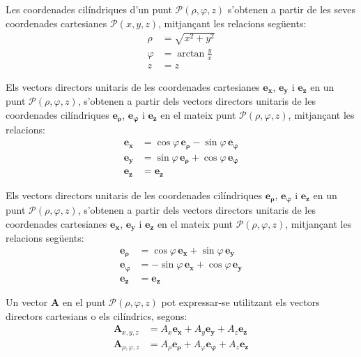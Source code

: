 \documentclass[catalan,a4paper,twoside,11pt]{article}
\begin{document}
Les coordenades  cilíndriques  d'un punt $\mathscr{P}(\rho,\varphi,z)$
s'obtenen a partir de les seves coordenades cartesianes $\mathscr{P}(x,y,z)$,
mitjançant les relacions següents:
\begin{subequations}\begin{align}
    \rho &= \sqrt{x^2+y^2}\\
    \varphi &=  \arctan\frac{y}{x}\\
    z &= z
\end{align}\end{subequations}

Els vectors directors unitaris de les coordenades cartesianes  $\boldsymbol{e_x}$, $\boldsymbol{e_y}$ i $\boldsymbol{e_z}$ en un punt $\mathscr{P}(\rho,\varphi,z)$,  s'obtenen a partir dels vectors directors unitaris de les coordenades cilíndriques $\boldsymbol{e_\rho}$, $\boldsymbol{e_\varphi}$ i $\boldsymbol{e_z}$ en el mateix punt $\mathscr{P}(\rho,\varphi,z)$, mitjançant les relacions:
\begin{subequations}\begin{align}
		\boldsymbol{e_x} &=\cos\varphi\,\boldsymbol{e_\rho}-\sin\varphi\,\boldsymbol{e_\varphi} \\
		\boldsymbol{e_y} &=\sin\varphi\,\boldsymbol{e_\rho}+\cos\varphi\,\boldsymbol{e_\varphi} \\
		\boldsymbol{e_z} &=\boldsymbol{e_z}
\end{align}\end{subequations}

Els vectors directors unitaris de les coordenades cilíndriques  $\boldsymbol{e_\rho}$, $\boldsymbol{e_\varphi}$ i $\boldsymbol{e_z}$ en un punt $\mathscr{P}(\rho,\varphi,z)$, s'obtenen a partir dels vectors directors unitaris de les coordenades cartesianes $\boldsymbol{e_x}$, $\boldsymbol{e_y}$ i $\boldsymbol{e_z}$ en el mateix punt $\mathscr{P}(\rho,\varphi,z)$, mitjançant les relacions següents:
\begin{subequations}\begin{align}
    \boldsymbol{e_\rho} &=\cos\varphi\,\boldsymbol{e_x}+\sin\varphi\,\boldsymbol{e_y} \\
    \boldsymbol{e_\varphi} &=-\sin\varphi\,\boldsymbol{e_x}+\cos\varphi\,\boldsymbol{e_y} \\
    \boldsymbol{e_z} &=\boldsymbol{e_z}
\end{align}\end{subequations}


Un vector $\boldsymbol{A}$ en el punt $\mathscr{P}(\rho, \varphi, z)$  pot expressar-se utilitzant els vectors directors cartesians o els cilíndrics, segons:
\begin{subequations}\begin{align}
		\boldsymbol{A}_{x,y,z} &= A_x \boldsymbol{e_x} + A_y \boldsymbol{e_y} + A_z \boldsymbol{e_z} \\
		\boldsymbol{A}_{\rho,\varphi,z} &= A_\rho  \boldsymbol{e_\rho} + A_\varphi \boldsymbol{e_\varphi} + A_z \boldsymbol{e_z}
\end{align}\end{subequations}
\end{document}
